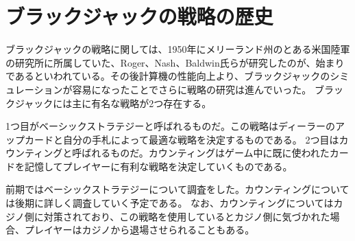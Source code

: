 
\section{ブラックジャックの戦略の歴史}
ブラックジャックの戦略に関しては、1950年にメリーランド州のとある米国陸軍の研究所に所属していた、Roger、Nash、Baldwin氏らが研究したのが、始まりであるといわれている。その後計算機の性能向上より、ブラックジャックのシミュレーションが容易になったことでさらに戦略の研究は進んでいった。
ブラックジャックには主に有名な戦略が2つ存在する。

1つ目がベーシックストラテジーと呼ばれるものだ。この戦略はディーラーのアップカードと自分の手札によって最適な戦略を決定するものである。
2つ目はカウンティングと呼ばれるものだ。カウンティングはゲーム中に既に使われたカードを記憶してプレイヤーに有利な戦略を決定していくものである。

前期ではベーシックストラテジーについて調査をした。カウンティングについては後期に詳しく調査していく予定である。
なお、カウンティングについてはカジノ側に対策されており、この戦略を使用しているとカジノ側に気づかれた場合、プレイヤーはカジノから退場させられることもある。
